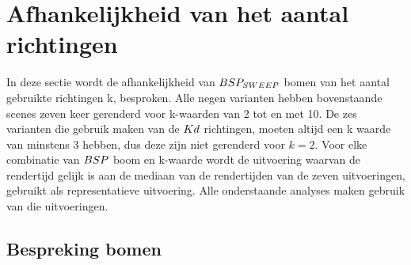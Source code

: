 \section{Afhankelijkheid van het aantal richtingen}
In deze sectie wordt de afhankelijkheid van $BSP_{SWEEP}$ bomen van het aantal gebruikte richtingen k, besproken. 
Alle negen varianten hebben bovenstaande scenes zeven keer gerenderd voor k-waarden van 2 tot en met 10.
De zes varianten die gebruik maken van de $Kd$ richtingen, moeten altijd een k waarde van minstens 3 hebben, dus deze zijn niet gerenderd voor $k = 2$.
Voor elke combinatie van $BSP$ boom en k-waarde wordt de uitvoering waarvan de rendertijd gelijk is aan de mediaan van de rendertijden van de zeven uitvoeringen, gebruikt als representatieve uitvoering.
Alle onderstaande analyses maken gebruik van die uitvoeringen.
\subsection{Bespreking bomen}
\label{h5-richtingen-bespreking}
